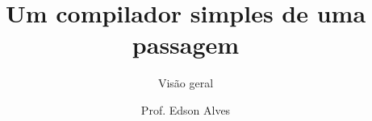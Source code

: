 \title{Um compilador simples de uma passagem}
\subtitle{Visão geral}
\date{}
\author{Prof. Edson Alves}
